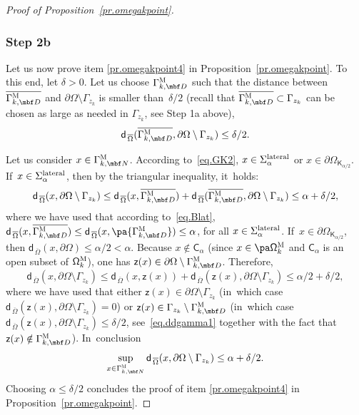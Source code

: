 \begin{proof}[Proof of Proposition~\ref{pr.omegakpoint}]
\subsubsection*{Step 2b}
Let us now prove item \eqref{pr.omegakpoint4} in Proposition~\ref{pr.omegakpoint}. To this end, let $\delta>0$. Let us choose $\Gamma_{k,\mbf D}^{\textsc{M}} $ such that the distance between $ \overline{\Gamma_{k,\mbf D}^{\textsc{M}} }$ and $\partial \Omega \setminus \Gamma_{z_k}$ is smaller than~$\delta/2$ (recall that $\overline{ \Gamma_{k,\mbf D}^{\textsc{M}} }\subset \Gamma_{z_k}$ can be chosen as large as needed in $\Gamma_{z_k}$, see Step 1a above),~\ie
\begin{equation}\label{eq.ddgamma1}
\mathsf d_{\, \overline \Omega}(\overline{\Gamma_{k,\mbf D}^{\textsc{M}} }, \partial \Omega \setminus \Gamma_{z_k})\le \delta/2.
\end{equation}

Let us consider $x\in \Gamma_{k,\mbf N}^{\textsc{M}}$. According to~\eqref{eq.GK2}, $x\in \Sigma_\alpha^{\textup{lateral}}$ or $x\in \partial \Omega_{\mathsf K_{\alpha/2}}$. If~$x\in \Sigma_\alpha^{\textup{lateral}}$, then by the triangular inequality, it~holds:
\[
\mathsf d_{\, \overline \Omega}(x, \partial \Omega \setminus \Gamma_{z_k}) \le \mathsf d_{\, \overline \Omega}(x, \overline{\Gamma_{k,\mbf D}^{\textsc{M}} }) +\mathsf d_{\, \overline \Omega}(\overline{\Gamma_{k,\mbf D}^{\textsc{M}} }, \partial \Omega \setminus \Gamma_{z_k})\le \alpha+\delta/2,
\]
where we have used that according to~\eqref{eq.Blat}, $\mathsf d_{\, \overline \Omega}(x, \overline{\Gamma_{k,\mbf D}^{\textsc{M}} })\le \mathsf d_{\, \overline \Omega}(x, \pa{\Gamma_{k,\mbf D}^{\textsc{M}} })\le \alpha$, for all $x\in \Sigma_\alpha^{\textup{lateral}}$. If~$x\in \partial \Omega_{\mathsf K_{\alpha/2}} $, then $ \mathsf d_{\, \overline \Omega}(x,\partial \Omega)\le \alpha/2<\alpha$.
Because $x\notin \mathsf C_\alpha$ (since $x\in \pa \mathsf \Omega_k^{\textsc{M}}$ and $\mathsf C_\alpha$ is an open subset of $\mathsf \Omega_k^{\textsc{M}}$), one has $\mathsf z(x)\in \partial \Omega\setminus \Gamma_{k,\mbf D}^{\textsc{M}} $. Therefore,
\[
\mathsf d_{\, \overline \Omega}(x, \partial \Omega \setminus \Gamma_{z_k})\le \mathsf d_{\, \overline \Omega}(x,\mathsf z(x))+\mathsf d_{\, \overline \Omega}(\mathsf z(x),\partial \Omega \setminus \Gamma_{z_k})\le \alpha/2 + \delta/2,
\]
where we have used that either $\mathsf z(x)\in \partial \Omega\setminus \Gamma_{z_k}$ (in~which case $\mathsf d_{\, \overline \Omega}(\mathsf z(x),\partial \Omega \setminus \Gamma_{z_k})=0$) or $\mathsf z(x)\in \Gamma_{z_k}\setminus \Gamma_{k,\mbf D}^{\textsc{M}} $ (in~which case $\mathsf d_{\, \overline \Omega}(\mathsf z(x),\partial \Omega \setminus \Gamma_{z_k})\le \delta/2$, see~\eqref{eq.ddgamma1} together with the fact that $\mathsf z(x)\notin \Gamma_{k,\mbf D}^{\textsc{M}} $). In~conclusion
\[
\sup_{x\in \Gamma_{k,\mbf N}^{\textsc{M}}}\mathsf d_{\, \overline \Omega}(x, \partial \Omega \setminus \Gamma_{z_k})\le \alpha+\delta/2.
\]
Choosing $\alpha\le \delta/2$ concludes the proof of item \eqref{pr.omegakpoint4} in Proposition~\ref{pr.omegakpoint}.


\end{proof}
